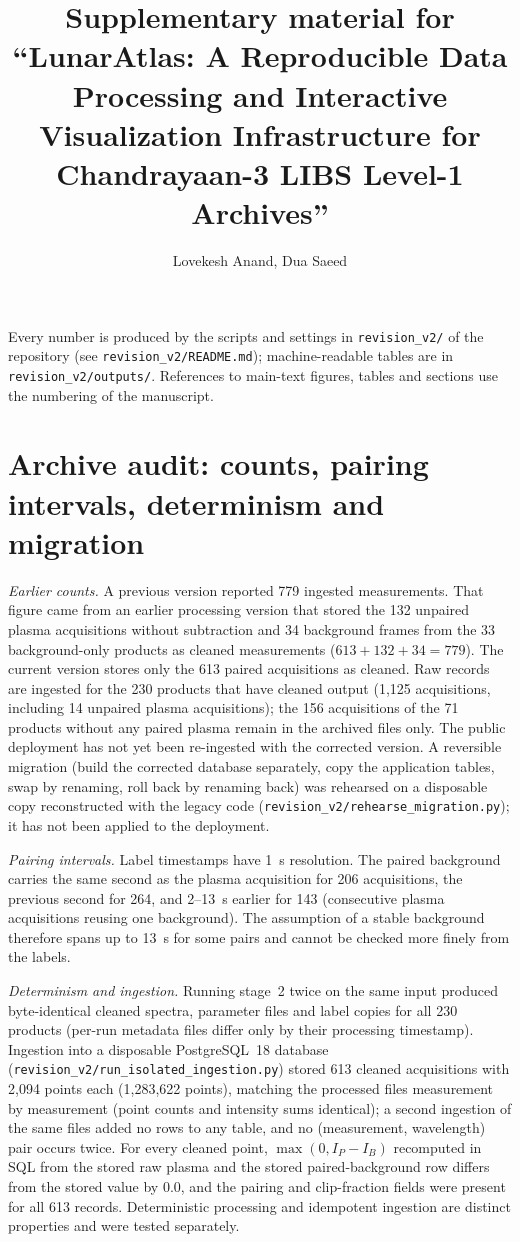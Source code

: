\documentclass[10pt,a4paper]{article}
\title{Supplementary material for\\ ``LunarAtlas: A Reproducible Data Processing and Interactive Visualization Infrastructure for Chandrayaan-3 LIBS Level-1 Archives''}
\author{Lovekesh Anand, Dua Saeed}
\date{}
\begin{document}
\maketitle

Every number is produced by the scripts and settings in \texttt{revision\_v2/} of the repository (see \texttt{revision\_v2/README.md}); machine-readable tables are in \texttt{revision\_v2/outputs/}. References to main-text figures, tables and sections use the numbering of the manuscript.

\section{Archive audit: counts, pairing intervals, determinism and migration}

\textit{Earlier counts.} A previous version reported 779 ingested measurements. That figure came from an earlier processing version that stored the 132 unpaired plasma acquisitions without subtraction and 34 background frames from the 33 background-only products as cleaned measurements ($613+132+34=779$). The current version stores only the 613 paired acquisitions as cleaned. Raw records are ingested for the 230 products that have cleaned output (1,125 acquisitions, including 14 unpaired plasma acquisitions); the 156 acquisitions of the 71 products without any paired plasma remain in the archived files only. The public deployment has not yet been re-ingested with the corrected version. A reversible migration (build the corrected database separately, copy the application tables, swap by renaming, roll back by renaming back) was rehearsed on a disposable copy reconstructed with the legacy code (\texttt{revision\_v2/rehearse\_migration.py}); it has not been applied to the deployment.

\textit{Pairing intervals.} Label timestamps have 1~s resolution. The paired background carries the same second as the plasma acquisition for 206 acquisitions, the previous second for 264, and 2--13~s earlier for 143 (consecutive plasma acquisitions reusing one background). The assumption of a stable background therefore spans up to 13~s for some pairs and cannot be checked more finely from the labels.

\textit{Determinism and ingestion.} Running stage~2 twice on the same input produced byte-identical cleaned spectra, parameter files and label copies for all 230 products (per-run metadata files differ only by their processing timestamp). Ingestion into a disposable PostgreSQL~18 database (\texttt{revision\_v2/run\_isolated\_ingestion.py}) stored 613 cleaned acquisitions with 2,094 points each (1,283,622 points), matching the processed files measurement by measurement (point counts and intensity sums identical); a second ingestion of the same files added no rows to any table, and no (measurement, wavelength) pair occurs twice. For every cleaned point, $\max(0, I_P-I_B)$ recomputed in SQL from the stored raw plasma and the stored paired-background row differs from the stored value by 0.0, and the pairing and clip-fraction fields were present for all 613 records. Deterministic processing and idempotent ingestion are distinct properties and were tested separately.
\end{document}
